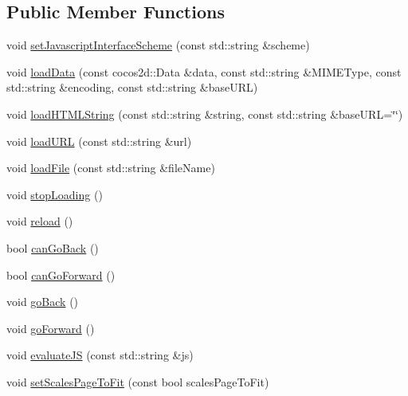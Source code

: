 \subsection*{Public Member Functions}
\begin{DoxyCompactItemize}
\item 
void \hyperlink{classexperimental_1_1ui_1_1WebView_a3beb4ee6d10fe0cc567483b65dabaa5b}{set\+Javascript\+Interface\+Scheme} (const std\+::string \&scheme)
\item 
void \hyperlink{classexperimental_1_1ui_1_1WebView_a80a8a6f40866b1db05ce9d866669fb2d}{load\+Data} (const cocos2d\+::\+Data \&data, const std\+::string \&M\+I\+M\+E\+Type, const std\+::string \&encoding, const std\+::string \&base\+U\+RL)
\item 
void \hyperlink{classexperimental_1_1ui_1_1WebView_aead3a24dfa6db7bb8175d3616a415c20}{load\+H\+T\+M\+L\+String} (const std\+::string \&string, const std\+::string \&base\+U\+RL=\char`\"{}\char`\"{})
\item 
void \hyperlink{classexperimental_1_1ui_1_1WebView_ac6824942bb8915c2b662ce185e9c82ee}{load\+U\+RL} (const std\+::string \&url)
\item 
void \hyperlink{classexperimental_1_1ui_1_1WebView_ac8b1fdef3df527682cfb9b875856f990}{load\+File} (const std\+::string \&file\+Name)
\item 
void \hyperlink{classexperimental_1_1ui_1_1WebView_a75b2a3f82d7c6ed497577e6ae481b81a}{stop\+Loading} ()
\item 
void \hyperlink{classexperimental_1_1ui_1_1WebView_a2176ef4153df90beadf3d00d780f8526}{reload} ()
\item 
bool \hyperlink{classexperimental_1_1ui_1_1WebView_a4ecc93bca134d1f5d15ae1e46c292608}{can\+Go\+Back} ()
\item 
bool \hyperlink{classexperimental_1_1ui_1_1WebView_a14f0dfa319d36a74db5afddf1a998b7d}{can\+Go\+Forward} ()
\item 
void \hyperlink{classexperimental_1_1ui_1_1WebView_a484fcf452270e21c41f192c41881c61f}{go\+Back} ()
\item 
void \hyperlink{classexperimental_1_1ui_1_1WebView_a7be24e3439501117335fb0063a1f4ea9}{go\+Forward} ()
\item 
void \hyperlink{classexperimental_1_1ui_1_1WebView_a5466fbae9364856565b8f4a6efa68ceb}{evaluate\+JS} (const std\+::string \&js)
\item 
void \hyperlink{classexperimental_1_1ui_1_1WebView_ab55307e1ac4bca0f38df14589a3c0924}{set\+Scales\+Page\+To\+Fit} (const bool scales\+Page\+To\+Fit)

\end{DoxyCompactItemize}

